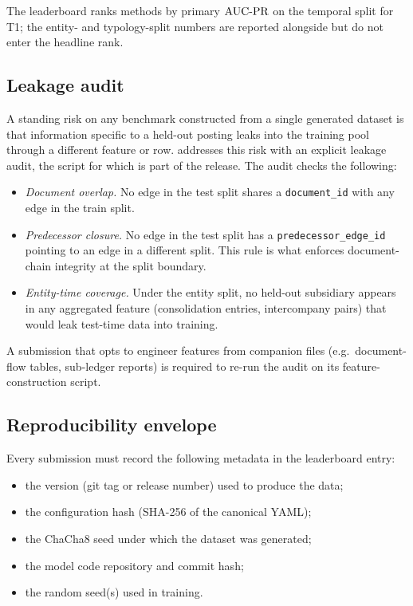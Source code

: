 The leaderboard ranks methods by primary $\operatorname{AUC\text{-}PR}$ on the temporal
split for T1; the entity- and typology-split numbers are reported
alongside but do not enter the headline rank.

\subsection{Leakage audit}
\label{sec:benchmark:leakage}

A standing risk on any benchmark constructed from a single
generated dataset is that information specific to a held-out
posting leaks into the training pool through a different feature
or row.  \bench{} addresses this risk with an explicit leakage
audit, the script for which is part of the release.  The audit
checks the following:

\begin{itemize}
  \item \emph{Document overlap.}  No edge in the test split shares
    a \texttt{document\_id} with any edge in the train split.
  \item \emph{Predecessor closure.}  No edge in the test split has
    a \texttt{predecessor\_edge\_id} pointing to an edge in a
    different split.  This rule is what enforces document-chain
    integrity at the split boundary.
  \item \emph{Entity-time coverage.}  Under the entity split, no
    held-out subsidiary appears in any aggregated feature
    (consolidation entries, intercompany pairs) that would leak
    test-time data into training.
\end{itemize}

A submission that opts to engineer features from companion files
(e.g.\ document-flow tables, sub-ledger reports) is required to
re-run the audit on its feature-construction script.

\subsection{Reproducibility envelope}
\label{sec:benchmark:repro}

Every submission must record the following metadata in the
leaderboard entry:

\begin{itemize}
  \item the \system{} version (git tag or release number) used to
    produce the data;
  \item the configuration hash (SHA-256 of the canonical YAML);
  \item the ChaCha8 seed under which the dataset was generated;
  \item the model code repository and commit hash;
  \item the random seed(s) used in training.
\end{itemize}

